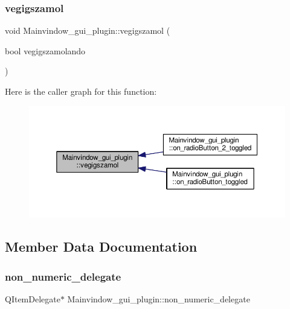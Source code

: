 \subsubsection{\texorpdfstring{vegigszamol}{vegigszamol}}
{\footnotesize\ttfamily void Mainvindow\+\_\+gui\+\_\+plugin\+::vegigszamol (\begin{DoxyParamCaption}\item[{bool}]{vegigszamolando }\end{DoxyParamCaption})\hspace{0.3cm}{\ttfamily [signal]}}

Here is the caller graph for this function\+:\nopagebreak
\begin{figure}[H]
\begin{center}
\leavevmode
\includegraphics[width=350pt]{classMainvindow__gui__plugin_a2fe7a4a60ee4e4f61579ccc717e8258d_icgraph}
\end{center}
\end{figure}


\subsection{Member Data Documentation}
\mbox{\label{classMainvindow__gui__plugin_adabe60e85b8b8dedc41da660506595a1}} 
\subsubsection{\texorpdfstring{non\+\_\+numeric\+\_\+delegate}{non\_numeric\_delegate}}
{\footnotesize\ttfamily Q\+Item\+Delegate$\ast$ Mainvindow\+\_\+gui\+\_\+plugin\+::non\+\_\+numeric\+\_\+delegate\hspace{0.3cm}{\ttfamily [private]}}



